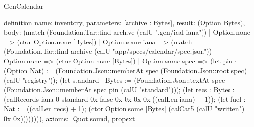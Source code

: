 \begin{lexlean}{GenCalendar}
\begin{semanticmodule}
definition{
  name: inventory,
  parameters: [archive : Bytes],
  result: (Option Bytes),
  body: (match (Foundation.Tar::find archive (calU ".gen/ical-iana"))
    | Option.none => (ctor Option.none [Bytes])
    | Option.some iana => (match (Foundation.Tar::find archive (calU "app/specs/calendar/spec.json"))
      | Option.none => (ctor Option.none [Bytes])
      | Option.some spec => (let pin : (Option Nat) := (Foundation.Json::memberAt spec (Foundation.Json::root spec) (calU "registry")); (let standard : Bytes := (Foundation.Json::textAt spec (Foundation.Json::memberAt spec pin (calU "standard"))); (let recs : Bytes := (calRecords iana 0 standard 0x false 0x 0x 0x 0x ((calLen iana) + 1)); (let fuel : Nat := ((calLen recs) + 1); (ctor Option.some [Bytes] (calCat5 (calU "written\n") 0x 0x)))))))),
  axioms: [Quot.sound, propext]
}


\end{semanticmodule}
\end{lexlean}
